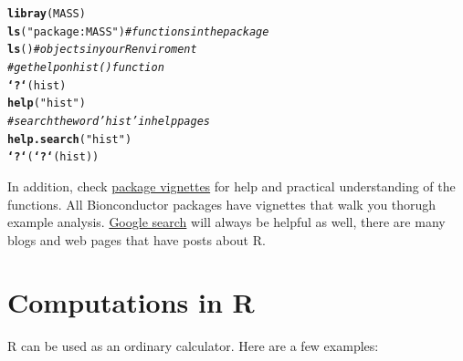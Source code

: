 \documentclass[english,nohyper]{tufte-book}\usepackage[]{graphicx}\usepackage[]{color}
\makeatletter
\newcommand{\hlstr}[1]{\textcolor[rgb]{0.192,0.494,0.8}{#1}}%
\newcommand{\hlcom}[1]{\textcolor[rgb]{0.678,0.584,0.686}{\textit{#1}}}%
\newcommand{\hlstd}[1]{\textcolor[rgb]{0.345,0.345,0.345}{#1}}%
\newcommand{\hlkwd}[1]{\textcolor[rgb]{0.737,0.353,0.396}{\textbf{#1}}}%
\newenvironment{kframe}{%
 \def\at@end@of@kframe{}%
 \ifinner\ifhmode%
  \def\at@end@of@kframe{\end{minipage}}%
  \begin{minipage}{\columnwidth}%
 \fi\fi%
 \def\FrameCommand##1{\hskip\@totalleftmargin \hskip-\fboxsep
 \colorbox{shadecolor}{##1}\hskip-\fboxsep
     \hskip-\linewidth \hskip-\@totalleftmargin \hskip\columnwidth}%
 \MakeFramed {\advance\hsize-\width
   \@totalleftmargin\z@ \linewidth\hsize
   \@setminipage}}%
 {\par\unskip\endMakeFramed%
 \at@end@of@kframe}
\newenvironment{knitrout}{}{} %
\makeatother
\begin{document}
\begin{knitrout}
\color{fgcolor}\begin{kframe}
\begin{alltt}
\hlkwd{libray}\hlstd{(MASS)}
\hlkwd{ls}\hlstd{(}\hlstr{"package:MASS"}\hlstd{)}  \hlcom{# functions in the package}
\hlkwd{ls}\hlstd{()}  \hlcom{# objects in your R enviroment}
\hlcom{# get help on hist() function}
\hlkwd{`?`}\hlstd{(hist)}
\hlkwd{help}\hlstd{(}\hlstr{"hist"}\hlstd{)}
\hlcom{# search the word 'hist' in help pages}
\hlkwd{help.search}\hlstd{(}\hlstr{"hist"}\hlstd{)}
\hlkwd{`?`}\hlstd{(}\hlkwd{`?`}\hlstd{(hist))}
\end{alltt}
\end{kframe}
\end{knitrout}


In addition, check \uline{package vignettes} for help and practical
understanding of the functions. All Bionconductor packages have vignettes
that walk you thorugh example analysis. \uline{Google search} will
always be helpful as well, there are many blogs and web pages that
have posts about R.


\section{Computations in R}

R can be used as an ordinary calculator. Here are a few examples:
\end{document}
